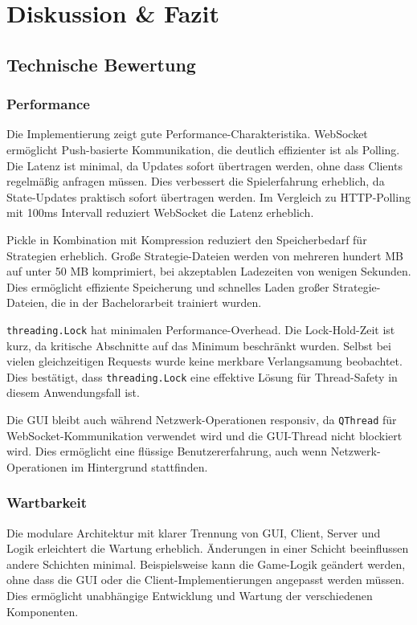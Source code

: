 \section{Diskussion \& Fazit}\label{sec:diskussion}

\subsection{Technische Bewertung}

\subsubsection{Performance}

Die Implementierung zeigt gute Performance-Charakteristika.
WebSocket ermöglicht Push-basierte Kommunikation, die deutlich effizienter ist als Polling.
Die Latenz ist minimal, da Updates sofort übertragen werden, ohne dass Clients regelmäßig anfragen müssen.
Dies verbessert die Spielerfahrung erheblich, da State-Updates praktisch sofort übertragen werden.
Im Vergleich zu HTTP-Polling mit 100ms Intervall reduziert WebSocket die Latenz erheblich.

Pickle in Kombination mit Kompression reduziert den Speicherbedarf für Strategien erheblich.
Große Strategie-Dateien werden von mehreren hundert MB auf unter 50 MB komprimiert, bei akzeptablen Ladezeiten von wenigen Sekunden.
Dies ermöglicht effiziente Speicherung und schnelles Laden großer Strategie-Dateien, die in der Bachelorarbeit trainiert wurden.

\texttt{threading.Lock} hat minimalen Performance-Overhead.
Die Lock-Hold-Zeit ist kurz, da kritische Abschnitte auf das Minimum beschränkt wurden.
Selbst bei vielen gleichzeitigen Requests wurde keine merkbare Verlangsamung beobachtet.
Dies bestätigt, dass \texttt{threading.Lock} eine effektive Lösung für Thread-Safety in diesem Anwendungsfall ist.

Die GUI bleibt auch während Netzwerk-Operationen responsiv, da \texttt{QThread} für WebSocket-Kommunikation verwendet wird und die GUI-Thread nicht blockiert wird.
Dies ermöglicht eine flüssige Benutzererfahrung, auch wenn Netzwerk-Operationen im Hintergrund stattfinden.

\subsubsection{Wartbarkeit}

Die modulare Architektur mit klarer Trennung von GUI, Client, Server und Logik erleichtert die Wartung erheblich.
Änderungen in einer Schicht beeinflussen andere Schichten minimal.
Beispielsweise kann die Game-Logik geändert werden, ohne dass die GUI oder die Client-Implementierungen angepasst werden müssen.
Dies ermöglicht unabhängige Entwicklung und Wartung der verschiedenen Komponenten.

